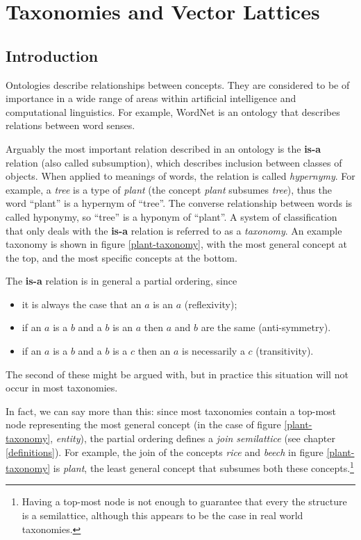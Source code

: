\documentclass{report}
\begin{document}
 
 \chapter{Taxonomies and Vector Lattices}
 

 \section{Introduction}

Ontologies describe relationships between concepts. They are considered to be of importance in a wide range of areas within artificial intelligence and computational linguistics. For example, WordNet \cite{Fellbaum:98} is an ontology that describes relations between word senses.

Arguably the most important relation described in an ontology is the \textbf{is-a} relation (also called subsumption), which describes inclusion between classes of objects.  When applied to meanings of words, the relation is called \emph{hypernymy}. For example, a \emph{tree} is a type of \emph{plant} (the concept \emph{plant} subsumes \emph{tree}), thus the word ``plant'' is a hypernym of ``tree''. The converse relationship between words is called hyponymy, so ``tree'' is a hyponym of ``plant''. A system of classification that only deals with the \textbf{is-a} relation is referred to as a \emph{taxonomy}. An example taxonomy is shown in figure \ref{plant-taxonomy}, with the most general concept at the top, and the most specific concepts at the bottom.

The \textbf{is-a} relation is in general a partial ordering, since
\begin{itemize}
\item it is always the case that an $a$ is an $a$ (reflexivity);
\item if an $a$ is a $b$ and a $b$ is an $a$ then $a$ and $b$ are the same (anti-symmetry).
\item if an $a$ is a $b$ and a $b$ is a $c$ then an $a$ is necessarily a $c$ (transitivity).
\end{itemize}
The second of these might be argued with, but in practice this situation will not occur in most taxonomies.

In fact, we can say more than this: since most taxonomies contain a top-most node representing the most general concept (in the case of figure \ref{plant-taxonomy}, \emph{entity}), the partial ordering defines a \emph{join semilattice} (see chapter \ref{definitions}). For example, the join of the concepts \emph{rice} and \emph{beech} in figure \ref{plant-taxonomy} is \emph{plant}, the least general concept that subsumes both these concepts.\footnote{Having a top-most node is not enough to guarantee that every the structure is a semilattice, although this appears to be the case in real world taxonomies.}
\end{document}
